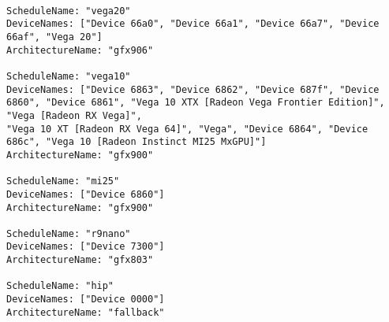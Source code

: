 \documentclass[]{article}
\begin{document}
\begin{verbatim}

ScheduleName: "vega20"
DeviceNames: ["Device 66a0", "Device 66a1", "Device 66a7", "Device 66af", "Vega 20"]
ArchitectureName: "gfx906"

ScheduleName: "vega10"
DeviceNames: ["Device 6863", "Device 6862", "Device 687f", "Device 6860", "Device 6861", "Vega 10 XTX [Radeon Vega Frontier Edition]", "Vega [Radeon RX Vega]",
"Vega 10 XT [Radeon RX Vega 64]", "Vega", "Device 6864", "Device 686c", "Vega 10 [Radeon Instinct MI25 MxGPU]"]
ArchitectureName: "gfx900"

ScheduleName: "mi25"
DeviceNames: ["Device 6860"]
ArchitectureName: "gfx900"

ScheduleName: "r9nano"
DeviceNames: ["Device 7300"]
ArchitectureName: "gfx803"

ScheduleName: "hip"
DeviceNames: ["Device 0000"]
ArchitectureName: "fallback"

\end{verbatim}
\end{document}

